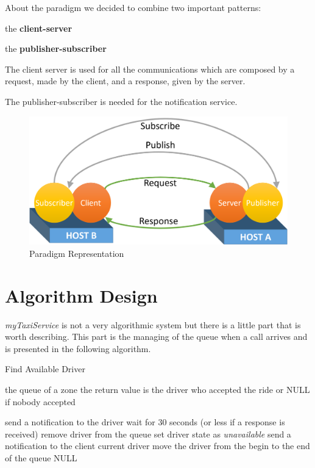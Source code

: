 \documentclass[a4paper]{article}
\begin{document}
About the paradigm we decided to combine two important patterns: 
\begin{itemize*}
\item the \textbf{client-server}
\item the \textbf{publisher-subscriber}
\end{itemize*}

The client server is used for all the communications which are composed by a request, made by the client, and a response, given by the server.

The publisher-subscriber is needed for the notification service.

\begin{figure}[H]
\includegraphics[width=.65\textwidth]{Paradigm}
\centering
\caption{Paradigm Representation}
\label{fig:paradigm}
\end{figure}

\section{Algorithm Design}
\label{sec:sec3}

\emph{myTaxiService} is not a very algorithmic system but there is a little part that is worth describing.
This part is the managing of the queue when a call arrives and is presented in the following algorithm.

\begin{center}
\begin{minipage}{.8\textwidth}
\begin{algorithm}[H]
\caption{Find Available Driver}
\label{alg:findavailabledriver}
\begin{algorithmic}
    
    \REQUIRE the queue of a zone
    \ENSURE the return value is the driver who accepted the ride or NULL if nobody accepted
    
        \STATE send a notification to the driver
        \STATE wait for 30 seconds (or less if a response is received)
            \STATE remove driver from the queue
            \STATE set driver state as \emph{unavailable}
            \STATE send a notification to the client
            \RETURN current driver
            \STATE move the driver from the begin to the end of the queue
        \ENDIF
    \ENDFOR
    \RETURN NULL
\end{algorithmic}
\end{algorithm}
\end{minipage}
\end{center}
\end{document}
